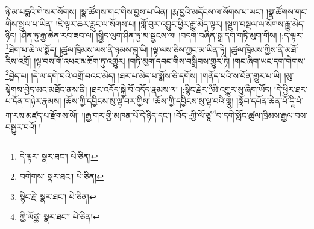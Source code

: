 ཉི་མ་པདྨའི་གེ་སར་སོགས། །སྣ་ཚོགས་གང་གིས་བྱས་པ་ཡིན། །རྨ་བྱའི་མདོངས་ལ་སོགས་པ་ཡང་། །སྣ་ཚོགས་གང་གིས་སྤྲུལ་པ་ཡིན། །ཇི་ལྟར་ཆར་རླུང་ལ་སོགས་པ། །གློ་བུར་འབྱུང་ཕྱིར་རྒྱུ་མེད་ལྟར། །སྡུག་བསྔལ་ལ་སོགས་རྒྱུ་མེད་ཉིད། །ཤིན་ཏུ་རྒྱ་ཆེན་རབ་ཟབ་ལ། །སྒྱིད་ལུག་ཤིན་ཏུ་མ་སྦྱངས་ལ། །བདག་བཞིན་སྒྲ་དག་གཏི་མུག་གིས། །:ད་ལྟར་\footnote{དེ་ལྟར་  སྣར་ཐང་།  པེ་ཅིན། }ཐེག་པ་ཆེ་ལ་སྨོད། །ཚུལ་ཁྲིམས་ལས་ནི་ཉམས་བླ་ཡི། །ལྟ་ལས་ཅིས་ཀྱང་མ་ཡིན་ཏེ། །ཚུལ་ཁྲིམས་ཀྱིས་ནི་མཐོ་རིས་འགྲོ། །ལྟ་བས་གོ་འཕང་མཆོག་ཏུ་འགྱུར། །གཏི་མུག་དབང་གིས་བསྒྲིབས་གྱུར་ཏེ། །གང་ཞིག་ཡང་དག་གེགས་\footnote{བགེགས་  སྣར་ཐང་།  པེ་ཅིན། }བྱེད་པ། །དེ་ལ་དགེ་བའི་འགྲོ་བའང་མེད། །ཐར་པ་མེད་པ་སྨོས་ཅི་དགོས། །གནོད་པའི་ས་བོན་གྱུར་པ་ཡི། །མུ་སྟེགས་བྱེད་མང་མཐོང་ནས་ནི། །ཐར་འདོད་སྐྱེ་བོ་འདོད་རྣམས་ལ། །:སྙིང་རྗེར་\footnote{སྙིང་རྗེ་  སྣར་ཐང་།  པེ་ཅིན། }མི་འགྱུར་སུ་ཞིག་ཡོད། །དེ་ཕྱིར་ཐར་པ་དོན་གཉེར་རྣམས། །ཆོས་ཀྱི་དབྱིངས་སུ་ལྟ་བར་གྱིས། །ཆོས་ཀྱི་དབྱིངས་སུ་ལྟ་བའི་གླུ། །སློབ་དཔོན་ཆེན་པོ་དཱི་པཾ་ཀ་རས་མཛད་པ་རྫོགས་སོ།། །།རྒྱ་གར་གྱི་མཁན་པོ་དེ་ཉིད་དང་། །བོད་:ཀྱི་ལོ་ཙཱ་\footnote{ཀྱི་ལོཙྪ་  སྣར་ཐང་།  པེ་ཅིན། }བ་དགེ་སློང་ཚུལ་ཁྲིམས་རྒྱལ་བས་བསྒྱུར་བའོ། ། 